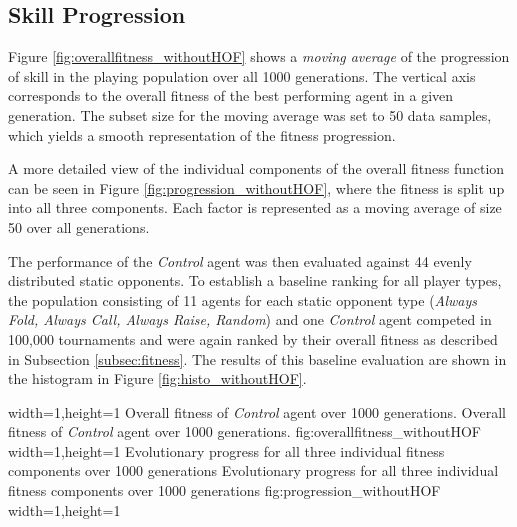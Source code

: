 \subsection{Skill Progression}
Figure \ref{fig:overallfitness_withoutHOF} shows a \textit{moving average} of the progression of skill in the playing population over all 1000 generations. The vertical axis corresponds to the overall fitness of the best performing agent in a given generation. The subset size for the moving average was set to 50 data samples, which yields a smooth representation of the fitness progression.\par
A more detailed view of the individual components of the overall fitness function can be seen in Figure \ref{fig:progression_withoutHOF}, where the fitness is split up into all three components. Each factor is represented as a moving average of size 50 over all generations.\par
{}
The performance of the \textit{Control} agent was then evaluated against 44 evenly distributed static opponents. To establish a baseline ranking for all player types, the population consisting of 11 agents for each static opponent type (\textit{Always Fold, Always Call, Always Raise, Random}) and one \textit{Control} agent competed in 100,000 tournaments and were again ranked by their overall fitness as described in Subsection \ref{subsec:fitness}. The results of this baseline evaluation are shown in the histogram in Figure \ref{fig:histo_withoutHOF}. \par
{}%
  {width=1\textwidth,height=1\textheight}%
  {Overall fitness of \textit{Control} agent over 1000 generations.}%
  {Overall fitness of \textit{Control} agent over 1000 generations.}%
  {fig:overallfitness_withoutHOF}%
  {width=1\textwidth,height=1\textheight}%
  {Evolutionary progress for all three individual fitness components over 1000 generations}%
  {Evolutionary progress for all three individual fitness components over 1000 generations}%
  {fig:progression_withoutHOF}%
  {width=1\textwidth,height=1\textheight}%
